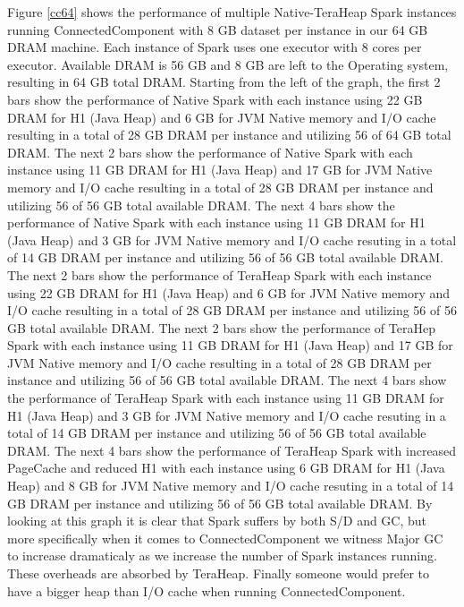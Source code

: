 \documentclass[twocolumn,10pt]{asme2e}
\begin{document}
Figure \ref{cc64} shows the performance of multiple Native-TeraHeap Spark instances running ConnectedComponent with 8 GB dataset per instance in our 64 GB DRAM machine. Each instance of Spark uses one executor with 8 cores per executor. Available DRAM is 56 GB and 8 GB are left to the Operating system, resulting in 64 GB total DRAM. Starting from the left of the graph, the first 2 bars show the performance of Native Spark with each instance using 22 GB DRAM for H1 (Java Heap) and 6 GB for JVM Native memory and I/O cache resulting in a total of 28 GB DRAM per instance and utilizing 56 of 64 GB total DRAM. The next 2 bars show the performance of Native Spark with each instance using 11 GB DRAM for H1 (Java Heap) and 17 GB for JVM Native memory and I/O cache resulting in a total of 28 GB DRAM per instance and utilizing 56 of 56 GB total available DRAM. The next 4 bars show the performance of Native Spark with each instance using 11 GB DRAM for H1 (Java Heap) and 3 GB for JVM Native memory and I/O cache resuting in a total of 14 GB DRAM per instance and utilizing 56 of 56 GB total available DRAM. 
The next 2 bars show the performance of TeraHeap Spark with each instance using 22 GB DRAM for H1 (Java Heap) and 6 GB for JVM Native memory and I/O cache resulting in a total of 28 GB DRAM per instance and utilizing 56 of 56 GB total available DRAM. The next 2 bars show the performance of TeraHep Spark with each instance using 11 GB DRAM for H1 (Java Heap) and 17 GB for JVM Native memory and I/O cache resulting in a total of 28 GB DRAM per instance and utilizing 56 of 56 GB total available DRAM. The next 4 bars show the performance of TeraHeap Spark with each instance using 11 GB DRAM for H1 (Java Heap) and 3 GB for JVM Native memory and I/O cache resuting in a total of 14 GB DRAM per instance and utilizing 56 of 56 GB total available DRAM. The next 4 bars show the performance of TeraHeap Spark with increased PageCache and reduced H1 with each instance using 6 GB DRAM for H1 (Java Heap) and 8 GB for JVM Native memory and I/O cache resuting in a total of 14 GB DRAM per instance and utilizing 56 of 56 GB total available DRAM.  
By looking at this graph it is clear that Spark suffers by both S/D and GC, but more specifically when it comes to ConnectedComponent we witness Major GC to increase dramaticaly as we increase the number of Spark instances running. These overheads are absorbed by TeraHeap. Finally someone would prefer to have a bigger heap than I/O cache when running ConnectedComponent.
\end{document}
